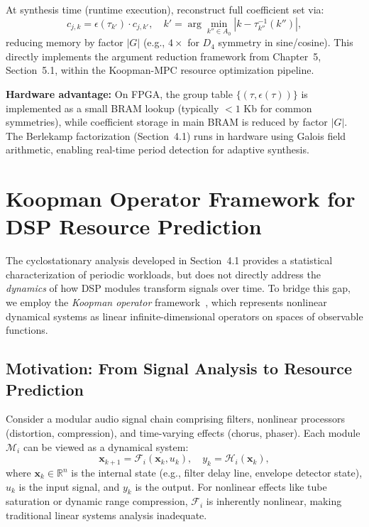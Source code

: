At synthesis time (runtime execution), reconstruct full coefficient set via:
\[
c_{j,k} = \epsilon(\tau_{k'}) \cdot c_{j,k'}, \quad k' = \arg\min_{k'' \in A_0} |k - \tau_{k''}^{-1}(k'')|,
\]
reducing memory by factor $|G|$ (e.g., $4\times$ for $D_4$ symmetry in sine/cosine). This directly implements the argument reduction framework from Chapter~5, Section~5.1, within the Koopman-MPC resource optimization pipeline.

\noindent\textbf{Hardware advantage:} On FPGA, the group table $\{(\tau, \epsilon(\tau))\}$ is implemented as a small BRAM lookup (typically $< 1$ Kb for common symmetries), while coefficient storage in main BRAM is reduced by factor $|G|$. The Berlekamp factorization (Section~4.1) runs in hardware using Galois field arithmetic, enabling real-time period detection for adaptive synthesis.

\section{Koopman Operator Framework for DSP Resource Prediction}

The cyclostationary analysis developed in Section~4.1 provides a statistical characterization of periodic workloads, but does not directly address the \emph{dynamics} of how DSP modules transform signals over time. To bridge this gap, we employ the \emph{Koopman operator} framework~\cite{Koopman1931,Budisic2012,Mauroy2020Book}, which represents nonlinear dynamical systems as linear infinite-dimensional operators on spaces of observable functions.

\subsection{Motivation: From Signal Analysis to Resource Prediction}

Consider a modular audio signal chain comprising filters, nonlinear processors (distortion, compression), and time-varying effects (chorus, phaser). Each module $\mathcal{M}_i$ can be viewed as a dynamical system:
\[
\mathbf{x}_{k+1} = \mathcal{F}_i(\mathbf{x}_k, u_k), \quad y_k = \mathcal{H}_i(\mathbf{x}_k),
\]
where $\mathbf{x}_k \in \mathbb{R}^n$ is the internal state (e.g., filter delay line, envelope detector state), $u_k$ is the input signal, and $y_k$ is the output. For nonlinear effects like tube saturation or dynamic range compression, $\mathcal{F}_i$ is inherently nonlinear, making traditional linear systems analysis inadequate.

